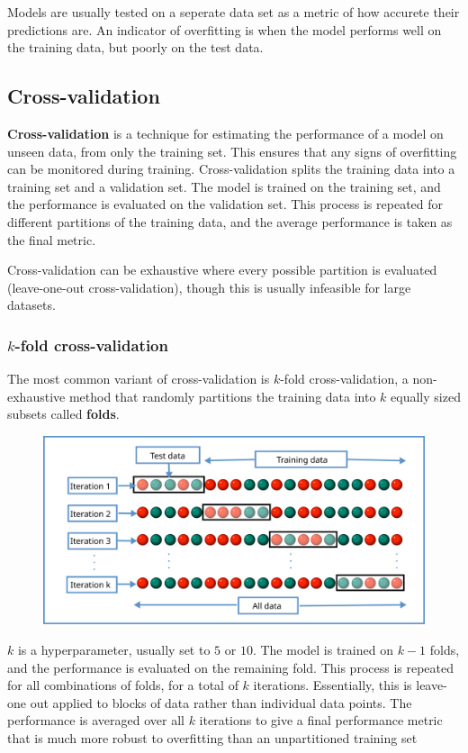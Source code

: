 \documentclass[12pt]{report}
\theoremstyle{definition}
\theoremstyle{remark}
\begin{document}
Models are usually tested on a seperate data set as a metric of how accurete their predictions are. An indicator of overfitting is when the model performs well on the training data, but poorly on the test data.

\subsection{Cross-validation}
\textbf{Cross-validation} is a technique for estimating the performance of a model on unseen data, from only the training set. This ensures that any signs of overfitting can be monitored during training. Cross-validation splits the training data into a training set and a validation set. The model is trained on the training set, and the performance is evaluated on the validation set. This process is repeated for different partitions of the training data, and the average performance is taken as the final metric.

Cross-validation can be exhaustive where every possible partition is evaluated (leave-one-out cross-validation), though this is usually infeasible for large datasets.

\subsubsection{$k$-fold cross-validation}
The most common variant of cross-validation is $k$-fold cross-validation, a non-exhaustive method that randomly partitions the training data into $k$ equally sized subsets called \textbf{folds}.

\begin{figure}[h]
    \centering
    \includegraphics[width=\linewidth]{figs/kfold_cross_validation.png}
    \caption{\cite{commons_filek-fold_2024}}
    \label{fig:enter-label}
\end{figure}

$k$ is a hyperparameter, usually set to $5$ or $10$. The model is trained on $k-1$ folds, and the performance is evaluated on the remaining fold. This process is repeated for all combinations of folds, for a total of $k$ iterations. Essentially, this is leave-one out applied to blocks of data rather than individual data points. The performance is averaged over all $k$ iterations to give a final performance metric that is much more robust to overfitting than an unpartitioned training set
\end{document}
